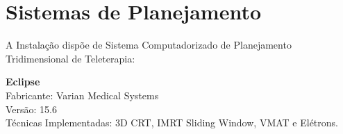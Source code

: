 \chapter{Sistemas de Planejamento}
\label{ch:sistema_planejamento}
A Instalação dispõe de Sistema Computadorizado de Planejamento Tridimensional de Teleterapia:

	\noindent \textbf{Eclipse}\\
	Fabricante: Varian Medical Systems\\
	Versão: 15.6\\
	Técnicas Implementadas: 3D CRT, IMRT Sliding Window, VMAT e Elétrons.\\
